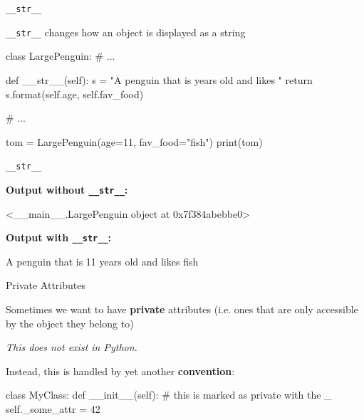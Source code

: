 \begin{frame}[fragile]{{\tt \_\_str\_\_}}

    \begin{block}{}
        {\tt \_\_str\_\_} changes how an object is displayed as a string
    \end{block}

    \begin{pythoncode}
class LargePenguin:
    # ...

    def __str__(self):
        s = "A penguin that is {} years old and likes {}"
        return s.format(self.age, self.fav_food)

    # ...

tom = LargePenguin(age=11, fav_food="fish")
print(tom)
    \end{pythoncode}

\end{frame}

\begin{frame}[fragile]{{\tt \_\_str\_\_}}

    {\bf Output without {\tt \_\_str\_\_}:}

    \vspace{1em}

    \begin{outputcode}
  <__main__.LargePenguin object at 0x7f384abebbe0>
    \end{outputcode}

    \vspace{2em}

    {\bf Output with {\tt \_\_str\_\_}:}

    \vspace{1em}

    \begin{outputcode}
  A penguin that is 11 years old and likes fish
    \end{outputcode}

\end{frame}

\begin{frame}[fragile]{Private Attributes}

    Sometimes we want to have {\bf private} attributes (i.e. ones that are only accessible by the object they belong to)

    \vspace{1em}

    {\it This does not exist in Python.}

    \vspace{1em}

    Instead, this is handled by yet another {\bf convention}:

    \vspace{1em}

    \begin{pythoncode}
class MyClass:
    def __init__(self):
        # this is marked as private with the _
        self._some_attr = 42
    \end{pythoncode}

\end{frame}

